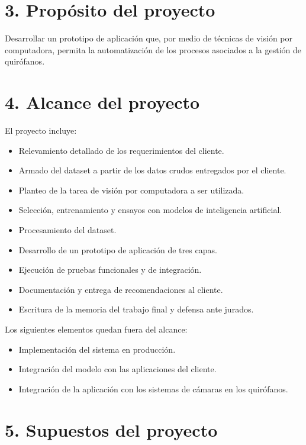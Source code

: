 \documentclass[
11pt, %
]{charter}
\begin{document}
\section{3. Propósito del proyecto}
\label{sec:proposito}

Desarrollar un prototipo de aplicación que, por medio de técnicas de visión por computadora, permita la automatización de los procesos asociados a la gestión de quirófanos.



\section{4. Alcance del proyecto}
\label{sec:alcance}

El proyecto incluye:
\begin{itemize}
	\item Relevamiento detallado de los requerimientos del cliente.
	\item Armado del dataset a partir de los datos crudos entregados por el cliente.
	\item Planteo de la tarea de visión por computadora a ser utilizada. 
	\item Selección, entrenamiento y ensayos con modelos de inteligencia artificial.
	\item Procesamiento del dataset.
	\item Desarrollo de un prototipo de aplicación de tres capas.
	\item Ejecución de pruebas funcionales y de integración.
	\item Documentación y entrega de recomendaciones al cliente.
	\item Escritura de la memoria del trabajo final y defensa ante jurados.
	
\end{itemize}

Los siguientes elementos quedan fuera del alcance:
\begin{itemize}
	\item Implementación del sistema en producción.
	\item Integración del modelo con las aplicaciones del cliente.
	\item Integración de la aplicación con los sistemas de cámaras en los quirófanos. 

\end{itemize}



\section{5. Supuestos del proyecto}
\label{sec:supuestos}
\end{document}

